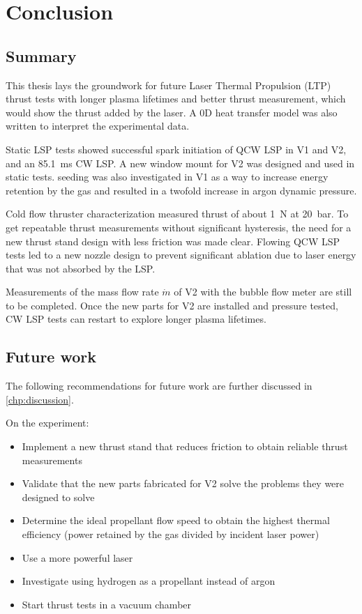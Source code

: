\chapter{Conclusion}
    \section{Summary}

        This thesis lays the groundwork for future Laser Thermal Propulsion (LTP) thrust tests with longer plasma lifetimes and better thrust measurement, which would show the thrust added by the laser. A 0D heat transfer model was also written to interpret the experimental data.

        Static LSP tests showed successful spark initiation of QCW LSP in V1 and V2, and an \qty{85.1}{ms} CW LSP. A new window mount for V2 was designed and used in static tests.  seeding was also investigated in V1 as a way to increase energy retention by the gas and resulted in a twofold increase in argon dynamic pressure. 

        Cold flow thruster characterization measured thrust of about \qty{1}{N} at \qty{20}{bar}. To get repeatable thrust measurements without significant hysteresis, the need for a new thrust stand design with less friction was made clear. Flowing QCW LSP tests led to a new nozzle design to prevent significant ablation due to laser energy that was not absorbed by the LSP. 
        
        Measurements of the mass flow rate $\dot m$ of V2 with the bubble flow meter are still to be completed. Once the new parts for V2 are installed and pressure tested, CW LSP tests can restart to explore longer plasma lifetimes.

    \section{Future work}

        The following recommendations for future work are further discussed in \autoref{chp:discussion}.
        
        On the experiment:
        \begin{itemize}
            \item Implement a new thrust stand that reduces friction to obtain reliable thrust measurements
            \item Validate that the new parts fabricated for V2 solve the problems they were designed to solve
            \item Determine the ideal propellant flow speed to obtain the highest thermal efficiency (power retained by the gas divided by incident laser power)
            \item Use a more powerful laser
            \item Investigate using hydrogen as a propellant instead of argon
            \item Start thrust tests in a vacuum chamber
        \end{itemize}

